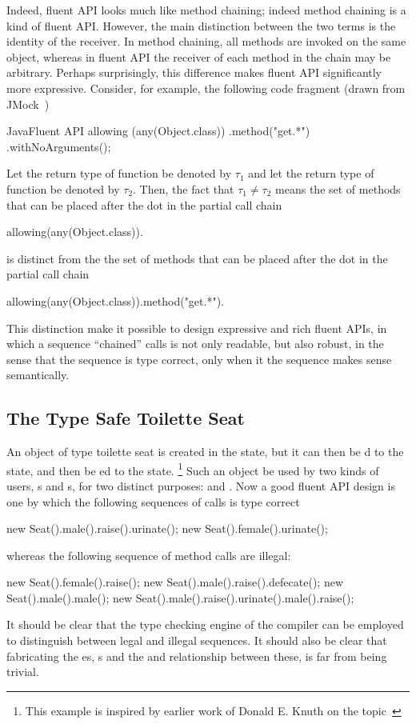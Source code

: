 Indeed, fluent API looks much like method chaining; indeed method chaining is a kind 
  of fluent API. 
However, the main distinction between the two terms is the identity of the receiver.
In method chaining, all methods are invoked on the same object, whereas in fluent API
  the receiver of each method in the chain may be arbitrary. 
Perhaps surprisingly, this difference makes fluent API significantly more expressive.
Consider, for example, the following code fragment (drawn from JMock~\cite{Freeman:Pryce:06}) 
\begin{lCode}{Java}{Fluent API}
allowing (any(Object.class))
  .method("get.*")
  .withNoArguments();
\end{lCode}
Let the return type of function  be denoted by $\tau_1$ and let the return type of function  be denoted by $\tau_2$. 
Then, the fact that $\tau_1 \ne \tau_2$ means the set of methods that can be placed after the dot 
in the partial call chain
\begin{lcode}
   allowing(any(Object.class)). 
\end{lcode}
is distinct from the the set of methods that can be placed after the dot in the partial call chain
\begin{lcode}
  allowing(any(Object.class)).method("get.*").
\end{lcode}
This distinction make it possible to design expressive and rich fluent APIs, in which a sequence ``chained'' calls is not only readable, but also
robust, in the sense that the sequence is type correct, only when it the sequence makes sense semantically. 

\subsection{The Type Safe Toilette Seat}

An object of type toilette seat is created in the  state, but it can then be d to the  state, and 
	then be ed to the  state. \footnote{
This example is inspired by earlier work of Donald E. Knuth on the topic~\cite{Knuth:92}}
Such an object be used by two kinds of users, s and s, for two distinct purposes:  and .
Now a good fluent API design is one by which the following sequences of calls is type correct
\begin{lcode}
  new Seat().male().raise().urinate();
  new Seat().female().urinate();
 \end{lcode}
whereas the following sequence of method calls are illegal:
\begin{lcode}
   new Seat().female().raise();
   new Seat().male().raise().defecate();
   new Seat().male().male();
   new Seat().male().raise().urinate().male().raise();
 \end{lcode}
It should be clear that the type checking engine of the compiler can 
be employed to distinguish between legal and illegal sequences.
It should also be clear that fabricating the es, s 
and the  and  relationship between these, is
far from being trivial. 

